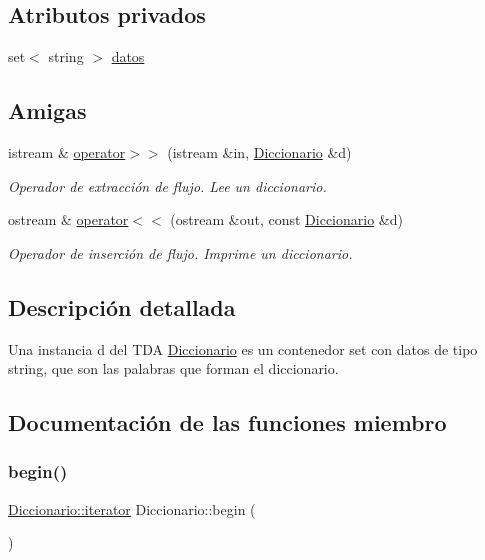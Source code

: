 \subsection*{Atributos privados}
\begin{DoxyCompactItemize}
\item 
set$<$ string $>$ \hyperlink{classDiccionario_aae047bbcc9d6bc3c7b0b2c308d39048d}{datos}
\end{DoxyCompactItemize}
\subsection*{Amigas}
\begin{DoxyCompactItemize}
\item 
istream \& \hyperlink{classDiccionario_acf72932a86e98d33aef771dde204a44d}{operator$>$$>$} (istream \&in, \hyperlink{classDiccionario}{Diccionario} \&d)
\begin{DoxyCompactList}\small\item\em Operador de extracción de flujo. Lee un diccionario. \end{DoxyCompactList}\item 
ostream \& \hyperlink{classDiccionario_aeb8c0d19c5f4c9d9680ab42b51dbb38e}{operator$<$$<$} (ostream \&out, const \hyperlink{classDiccionario}{Diccionario} \&d)
\begin{DoxyCompactList}\small\item\em Operador de inserción de flujo. Imprime un diccionario. \end{DoxyCompactList}\end{DoxyCompactItemize}


\subsection{Descripción detallada}
Una instancia d del T\+DA \hyperlink{classDiccionario}{Diccionario} es un contenedor set con datos de tipo string, que son las palabras que forman el diccionario. 

\subsection{Documentación de las funciones miembro}
\mbox{\label{classDiccionario_ab270eb969d580f01b358e648a3061ac4}} 
\subsubsection{\texorpdfstring{begin()}{begin()}\hspace{0.1cm}{\footnotesize\ttfamily [1/2]}}
{\footnotesize\ttfamily \hyperlink{classDiccionario_a51a063699a325e85d6c2640e9c4b42cf}{Diccionario\+::iterator} Diccionario\+::begin (\begin{DoxyParamCaption}{ }\end{DoxyParamCaption})}



